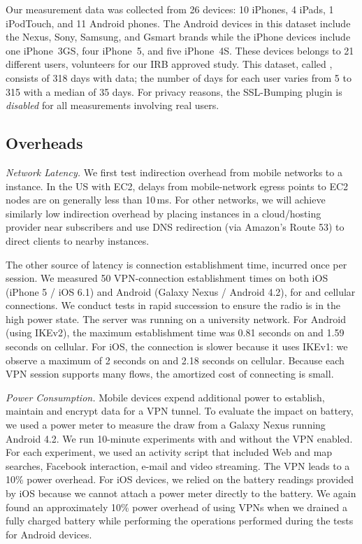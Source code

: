 Our measurement data was collected from 26 devices: 10 iPhones, 4 iPads, 1 iPodTouch, and 11
Android phones.  The Android devices in this dataset include the
Nexus, Sony, Samsung, and Gsmart brands while the iPhone devices
include one iPhone~3GS, four iPhone~5, and five iPhone~4S.  These
devices belongs to 21 different users, volunteers for our IRB approved
study.  This dataset, called \mobWild, consists of 318 days with data; the number of 
days for each user varies from 5 to 315 with a median of 35 days.  For privacy reasons, the
SSL-Bumping plugin is \emph{disabled} for all measurements involving
real users.


\subsection{Overheads}
\noindent\emph{Network Latency.}
We first test indirection overhead from mobile networks to a \meddle instance. In the 
US with EC2, delays from mobile-network egress points to EC2 nodes are on generally less than 10\,ms. 
For other networks, we will achieve similarly low indirection overhead by placing instances in a cloud/hosting 
provider near subscribers and use DNS redirection (\eg via Amazon's Route 53) to direct clients to nearby instances. 

The other source of latency is connection establishment time, incurred once per session. We measured 
50 VPN-connection establishment times on both iOS (iPhone 5 / iOS 6.1) and Android (Galaxy Nexus /
Android 4.2), for \wifi{} and cellular connections. We conduct tests in rapid succession to ensure the radio is in the high power state.
The \meddle server was running on a university network. 
For Android (using IKEv2), the maximum establishment time was 0.81 seconds on \wifi{} and 1.59 seconds on cellular. 
For iOS, the connection is slower because it uses IKEv1: we observe a maximum of 2 seconds on \wifi{} and 2.18 seconds on cellular. 
Because each VPN session supports many flows, the amortized cost of connecting is  small. 

\noindent\emph{Power Consumption.}
Mobile devices expend additional power to establish, maintain and encrypt data for a VPN tunnel. 
To evaluate the impact on battery, we used a power meter to measure the draw from a Galaxy Nexus running Android 4.2. 
We run 10-minute experiments with and without the VPN enabled. 
For each experiment, we used an activity script that included Web and map searches, Facebook interaction, e-mail and video
streaming. 
The VPN leads to a 10\% power overhead. 
For iOS devices, we relied on the battery readings provided by iOS because we cannot attach a power meter directly to the battery.
We again found an approximately 10\% power overhead of using VPNs when we drained a fully charged battery while performing the operations performed during the tests for Android devices.  

